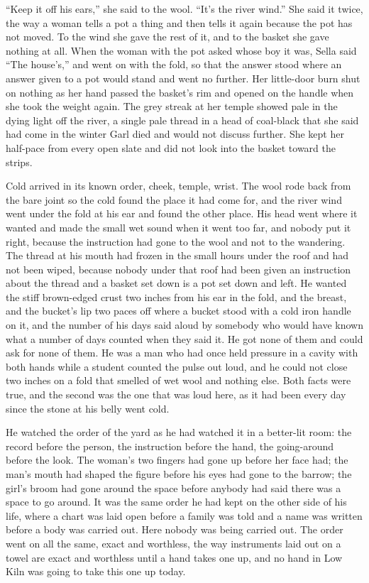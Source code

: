 “Keep it off his ears,” she said to the wool. “It's the river wind.” She said it twice, the way a woman tells a pot a thing and then tells it again because the pot has not moved. To the wind she gave the rest of it, and to the basket she gave nothing at all. When the woman with the pot asked whose boy it was, Sella said “The house's,” and went on with the fold, so that the answer stood where an answer given to a pot would stand and went no further. Her little-door burn shut on nothing as her hand passed the basket's rim and opened on the handle when she took the weight again. The grey streak at her temple showed pale in the dying light off the river, a single pale thread in a head of coal-black that she said had come in the winter Garl died and would not discuss further. She kept her half-pace from every open slate and did not look into the basket toward the strips.

Cold arrived in its known order, cheek, temple, wrist. The wool rode back from the bare joint so the cold found the place it had come for, and the river wind went under the fold at his ear and found the other place. His head went where it wanted and made the small wet sound when it went too far, and nobody put it right, because the instruction had gone to the wool and not to the wandering. The thread at his mouth had frozen in the small hours under the roof and had not been wiped, because nobody under that roof had been given an instruction about the thread and a basket set down is a pot set down and left. He wanted the stiff brown-edged crust two inches from his ear in the fold, and the breast, and the bucket's lip two paces off where a bucket stood with a cold iron handle on it, and the number of his days said aloud by somebody who would have known what a number of days counted when they said it. He got none of them and could ask for none of them. He was a man who had once held pressure in a cavity with both hands while a student counted the pulse out loud, and he could not close two inches on a fold that smelled of wet wool and nothing else. Both facts were true, and the second was the one that was loud here, as it had been every day since the stone at his belly went cold.

He watched the order of the yard as he had watched it in a better-lit room: the record before the person, the instruction before the hand, the going-around before the look. The woman's two fingers had gone up before her face had; the man's mouth had shaped the figure before his eyes had gone to the barrow; the girl's broom had gone around the space before anybody had said there was a space to go around. It was the same order he had kept on the other side of his life, where a chart was laid open before a family was told and a name was written before a body was carried out. Here nobody was being carried out. The order went on all the same, exact and worthless, the way instruments laid out on a towel are exact and worthless until a hand takes one up, and no hand in Low Kiln was going to take this one up today.

